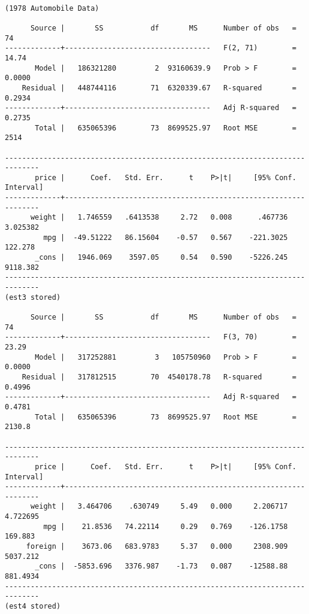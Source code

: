 \documentclass[10pt,parskip=half,
	toc=sectionentrywithdots,
	bibliography=totocnumbered,
	captions=tableheading,numbers=noendperiod]{scrartcl}
\begin{document}
\begin{lstlisting}[language={},postbreak={},numbers=none,xrightmargin=7pt,belowskip=5pt,aboveskip=5pt,breakindent=0pt]

(1978 Automobile Data)

      Source |       SS           df       MS      Number of obs   =        74
-------------+----------------------------------   F(2, 71)        =     14.74
       Model |   186321280         2  93160639.9   Prob > F        =    0.0000
    Residual |   448744116        71  6320339.67   R-squared       =    0.2934
-------------+----------------------------------   Adj R-squared   =    0.2735
       Total |   635065396        73  8699525.97   Root MSE        =      2514

------------------------------------------------------------------------------
       price |      Coef.   Std. Err.      t    P>|t|     [95% Conf. Interval]
-------------+----------------------------------------------------------------
      weight |   1.746559   .6413538     2.72   0.008      .467736    3.025382
         mpg |  -49.51222   86.15604    -0.57   0.567    -221.3025     122.278
       _cons |   1946.069    3597.05     0.54   0.590    -5226.245    9118.382
------------------------------------------------------------------------------
(est3 stored)

      Source |       SS           df       MS      Number of obs   =        74
-------------+----------------------------------   F(3, 70)        =     23.29
       Model |   317252881         3   105750960   Prob > F        =    0.0000
    Residual |   317812515        70  4540178.78   R-squared       =    0.4996
-------------+----------------------------------   Adj R-squared   =    0.4781
       Total |   635065396        73  8699525.97   Root MSE        =    2130.8

------------------------------------------------------------------------------
       price |      Coef.   Std. Err.      t    P>|t|     [95% Conf. Interval]
-------------+----------------------------------------------------------------
      weight |   3.464706    .630749     5.49   0.000     2.206717    4.722695
         mpg |    21.8536   74.22114     0.29   0.769    -126.1758     169.883
     foreign |    3673.06   683.9783     5.37   0.000     2308.909    5037.212
       _cons |  -5853.696   3376.987    -1.73   0.087    -12588.88    881.4934
------------------------------------------------------------------------------
(est4 stored)

\end{lstlisting}
\end{document}
